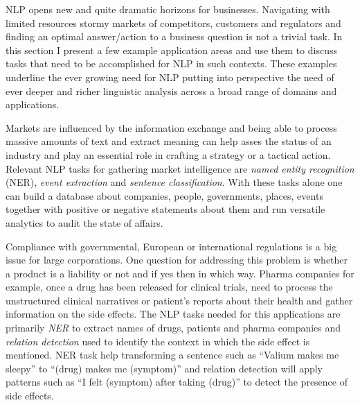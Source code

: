 NLP opens new and quite dramatic horizons for businesses. Navigating with limited resources stormy markets of competitors, customers and regulators and finding an optimal answer/action to a business question is not a trivial task. In this section I present a few example application areas and use them to discuss tasks that need to be accomplished for NLP in such contexts. These examples underline the ever growing need for NLP putting into perspective the need of ever deeper and richer linguistic analysis across a broad range of domains and applications.

Markets are influenced by the information exchange and being able to process massive amounts of text and extract meaning can help asses the status of an industry and play an essential role in crafting a strategy or a tactical action. 
Relevant NLP tasks for gathering market intelligence are \textit{named entity recognition} (NER), \textit{event extraction} and \textit{sentence classification}. With these tasks alone one can build a database about companies, people, governments, places, events together with positive or negative statements about them and run versatile analytics to audit the state of affairs.

Compliance with governmental, European or international regulations is a big issue for large corporations. One question for addressing this problem is whether a product is a liability or not and if yes then in which way. Pharma companies for example, once a drug has been released for clinical trials, need to process the unstructured clinical narratives or patient's reports about their health and gather information on the side effects. The NLP tasks needed for this applications are primarily \textit{NER} to extract names of drugs, patients and pharma companies and \textit{relation detection} used to identify the context in which the side effect is mentioned. NER task help transforming a sentence such as ``Valium makes me sleepy'' to ``(drug) makes me (symptom)'' and relation detection will apply patterns such as ``I felt (symptom) after taking (drug)'' to detect the presence of side effects.


